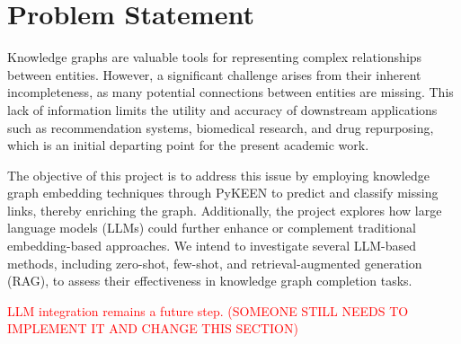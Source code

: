 \section*{Problem Statement}


Knowledge graphs are valuable tools for representing complex relationships between entities. However, a significant challenge arises from their inherent incompleteness, as many potential connections between entities are missing. This lack of information limits the utility and accuracy of downstream applications such as recommendation systems, biomedical research, and drug repurposing, which is an initial departing point for the present academic work.

The objective of this project is to address this issue by employing knowledge graph embedding techniques through PyKEEN \cite{pykeen} to predict and classify missing links, thereby enriching the graph. Additionally, the project explores how large language models (LLMs) could further enhance or complement traditional embedding-based approaches. We intend to investigate several LLM-based methods, including zero-shot, few-shot, and retrieval-augmented generation (RAG), to assess their effectiveness in knowledge graph completion tasks.

\textcolor{red}{LLM integration remains a future step. (\textcolor{red}{SOMEONE STILL NEEDS TO IMPLEMENT IT AND CHANGE THIS SECTION})}
